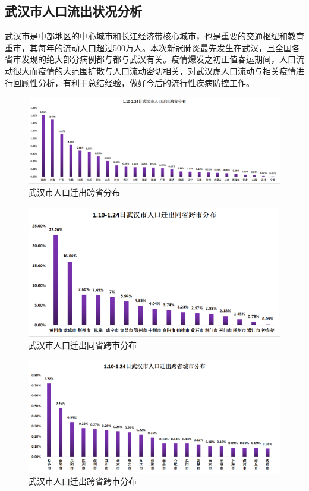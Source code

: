 \documentclass[12pt,hyperref,]{ctexart}
\begin{document}
\hypertarget{ux6b66ux6c49ux5e02ux4ebaux53e3ux6d41ux51faux72b6ux51b5ux5206ux6790}{%
\subsection{武汉市人口流出状况分析}\label{ux6b66ux6c49ux5e02ux4ebaux53e3ux6d41ux51faux72b6ux51b5ux5206ux6790}}

武汉市是中部地区的中心城市和长江经济带核心城市，也是重要的交通枢纽和教育重市，其每年的流动人口超过500万人。本次新冠肺炎最先发生在武汉，且全国各省市发现的绝大部分病例都与都与武汉有关。疫情爆发之初正值春运期间，人口流动很大而疫情的大范围扩散与人口流动密切相关，对武汉虎人口流动与相关疫情进行回顾性分析，有利于总结经验，做好今后的流行性疾病防控工作。

\begin{figure}
\includegraphics[width=8.33in]{image/3.2.1} \caption{武汉市人口迁出跨省分布}\label{fig:3.4}
\end{figure}

\begin{figure}
\includegraphics[width=8.33in]{image/3.2.2} \caption{武汉市人口迁出同省跨市分布}\label{fig:3.5}
\end{figure}

\begin{figure}
\includegraphics[width=8.33in]{image/3.2.3} \caption{武汉市人口迁出跨省跨市分布}\label{fig:3.6}
\end{figure}
\end{document}
